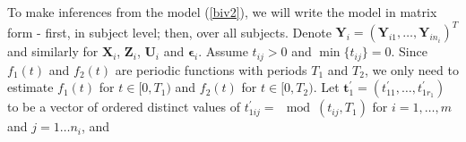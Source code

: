 \documentclass[article,lineno]{biometrika}
\begin{document}
To make inferences from the model (\ref{biv2}), we will  write the model in matrix form -  first, in subject level; then, over all subjects.  
Denote $\bm Y_{i} = (\bm Y_{i1}, \dots, \bm Y_{in_i})^T$ and similarly for $\bm X_i$, $\bm Z_i$, $\bm U_i$ and $\bm \epsilon_i$. 
Assume $t_{ij} > 0$ and $ \min \{t_{ij}\} = 0$. 
Since  $f_1(t)$ and $f_2(t)$ are  periodic functions with periods $T_1$ and $T_2$, we only need to estimate $f_1(t)$ for $t \in [0, T_1)$ and $f_2(t)$ for $t \in [0, T_2)$. 
Let 
 $
\boldsymbol t_1^\prime = (t_{11}^\prime, \dots, t_{1r_1}^\prime)
 $
 to be a vector of ordered distinct values of $t_{1ij}^\prime =\mod{(t_{ij}, T_1)}$ for $i = 1, \dots, m$ and $j = 1\dots n_i$, and 
\end{document}
